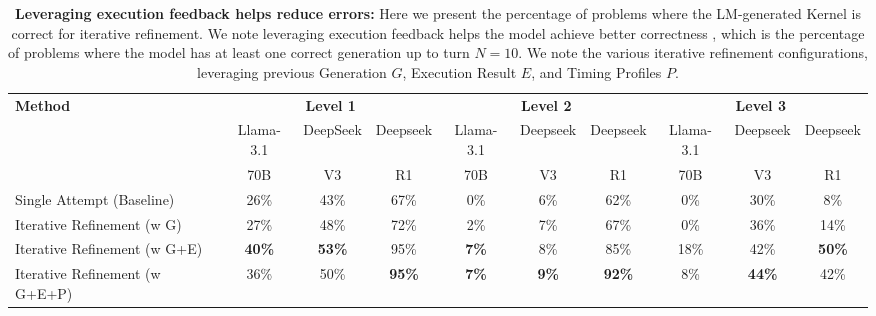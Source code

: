 \begin{table*}[ht]
\centering
\setlength{\tabcolsep}{2pt} %
{\small %
\begin{tabular}{l|ccc|ccc|ccc}
\toprule
\multirow{3}{*}{\textbf{Method}} & \multicolumn{3}{c|}{\textbf{Level 1}} & \multicolumn{3}{c|}{\textbf{Level 2}} & \multicolumn{3}{c}{\textbf{Level 3}} \\
 & \scriptsize{Llama-3.1} & \scriptsize{DeepSeek} & \scriptsize{Deepseek} & \scriptsize{Llama-3.1} &  \scriptsize{Deepseek} &  \scriptsize{Deepseek} &  \scriptsize{Llama-3.1} &  \scriptsize{Deepseek} &  \scriptsize{Deepseek} \\
 & \small{70B} & \small{V3} & \small{R1} & \small{70B} & \small{V3} & \small{R1} & \small{70B} & \small{V3} & \small{R1} \\
\midrule
Single Attempt (Baseline) & 26\% & 43\% & 67\% & 0\% & 6\% & 62\% & 0\% & 30\% & 8\% \\
\midrule
Iterative Refinement (w G) & 27\% & 48\% & 72\% & 2\% & 7\% & 67\% & 0\% & 36\% & 14\% \\
Iterative Refinement (w G+E) & \textbf{40\%} & \textbf{53\%} & 95\% & \textbf{7\%} & 8\% & 85\% & 18\% & 42\% & \textbf{50\%} \\
Iterative Refinement (w G+E+P) & 36\% & 50\% & \textbf{95\%} & \textbf{7\%} & \textbf{9\%} & \textbf{92\%} & 8\% & \textbf{44\%} & 42\% \\
\bottomrule
\end{tabular}
}
\caption{\textbf{Leveraging execution feedback helps reduce errors:} Here we present the percentage of problems where the LM-generated Kernel is correct for iterative refinement. We note leveraging execution feedback helps the model achieve better correctness , which is the percentage of problems where the model has at least one correct generation up to turn $N=10$. We note the various iterative refinement configurations, leveraging previous Generation $G$, Execution Result $E$, and Timing Profiles $P$.}
\label{table:fast0-method-comparison}
\end{table*}